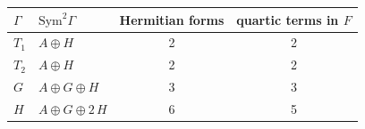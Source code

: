 \begin{tabular}{llcc}
\hline
$\Gamma$ & $\mathrm{Sym}^2\Gamma$ & Hermitian forms & quartic terms in $F$ \\
\hline
$T_1$ & $A \oplus H$ & 2 & 2 \\
$T_2$ & $A \oplus H$ & 2 & 2 \\
$G$ & $A \oplus G \oplus H$ & 3 & 3 \\
$H$ & $A \oplus G \oplus 2\,H$ & 6 & 5 \\
\hline
\end{tabular}
